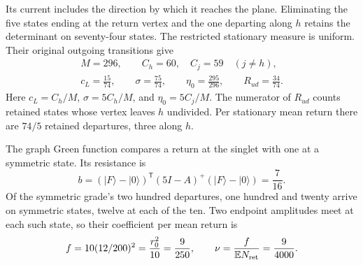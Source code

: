 \documentclass[aps,prx,reprint,longbibliography]{revtex4-2}
\providecommand{\E}{\mathbb E}
\begin{document}
Its current includes the direction by which it reaches the plane. Eliminating the five states ending at the return vertex and the one departing along $h$ retains the determinant on seventy-four states. The restricted stationary measure is uniform. Their original outgoing transitions give
\begin{equation}
 \begin{gathered}
 M=296,\qquad C_h=60,\quad C_j=59\quad(j\ne h),\\
 c_L=\frac{15}{74},\qquad\sigma=\frac{75}{74},\qquad
 \eta_0=\frac{295}{296},\qquad R_{ud}=\frac{34}{74}.
 \end{gathered}
 \label{eq:stationary}
\end{equation}
Here $c_L=C_h/M$, $\sigma=5C_h/M$, and $\eta_0=5C_j/M$. The numerator of $R_{ud}$ counts retained states whose vertex leaves $h$ undivided. Per stationary mean return there are $74/5$ retained departures, three along $h$.

The graph Green function compares a return at the singlet with one at a symmetric state. Its resistance is
\begin{equation}
 b=(\lvert F\rangle-\lvert0\rangle)^{\mathsf T}(5I-A)^+
       (\lvert F\rangle-\lvert0\rangle)=\frac7{16}.
 \label{eq:green}
\end{equation}
Of the symmetric grade's two hundred departures, one hundred and twenty arrive on symmetric states, twelve at each of the ten. Two endpoint amplitudes meet at each such state, so their coefficient per mean return is
\begin{equation}
 f=10(12/200)^2=\frac{r_0^2}{10}=\frac9{250},\qquad
 \nu=\frac f{\E N_{\rm ret}}=\frac9{4000}.
 \label{eq:electric_small}
\end{equation}
\end{document}
